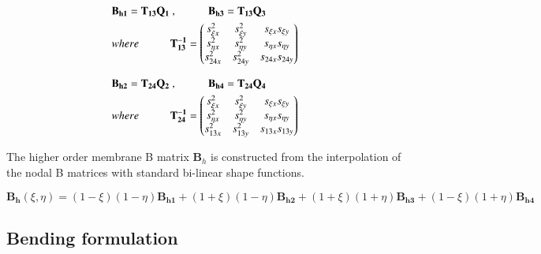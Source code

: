 \begin{gather} 
	\begin{aligned}
		&\mathbf{B_{h1}} = \mathbf{T_{13}}  \mathbf{Q_{1}}\ ,
		\hspace{10mm}
		\mathbf{B_{h3}} = \mathbf{T_{13}}  \mathbf{Q_{3}}\\
		&where 
		\hspace{10mm} 
		\mathbf{T_{13}^{-1}} =
		\begin{pmatrix}
			s_{\xi x}^2 & s_{\xi y}^2 & s_{\xi x} s_{\xi y} \\
			s_{\eta x}^2 & s_{\eta y}^2 & s_{\eta x} s_{\eta y} \\
			s_{24 x}^2 & s_{24 y}^2 & s_{24 x} s_{24 y}
		\end{pmatrix}
		\label{equation17}
	\end{aligned}
\end{gather}


\begin{gather} 
	\begin{aligned}
		&\mathbf{B_{h2}} = \mathbf{T_{24}}  \mathbf{Q_{2}}\ ,
		\hspace{10mm}
		\mathbf{B_{h4}} = \mathbf{T_{24}}  \mathbf{Q_{4}}\\
		&where 
		\hspace{10mm} 
		\mathbf{T_{24}^{-1}} =
		\begin{pmatrix}
			s_{\xi x}^2 & s_{\xi y}^2 & s_{\xi x} s_{\xi y} \\
			s_{\eta x}^2 & s_{\eta y}^2 & s_{\eta x} s_{\eta y} \\
			s_{13 x}^2 & s_{13 y}^2 & s_{13 x} s_{13 y}
		\end{pmatrix}
		\label{equation18}
	\end{aligned}
\end{gather}

The higher order membrane B matrix $\mathbf{B}_h$ is constructed from the interpolation of the nodal B matrices with standard bi-linear shape functions.

\begin{equation} 
\mathbf{B_h}(\xi,\eta) = (1-\xi)(1-\eta)\mathbf{B_{h1}} + (1+\xi)(1-\eta)\mathbf{B_{h2}} + (1+\xi)(1+\eta)\mathbf{B_{h3}} +	(1-\xi)(1+\eta)\mathbf{B_{h4}} 
\label{equation19}
\end{equation}


\subsection{Bending formulation}

